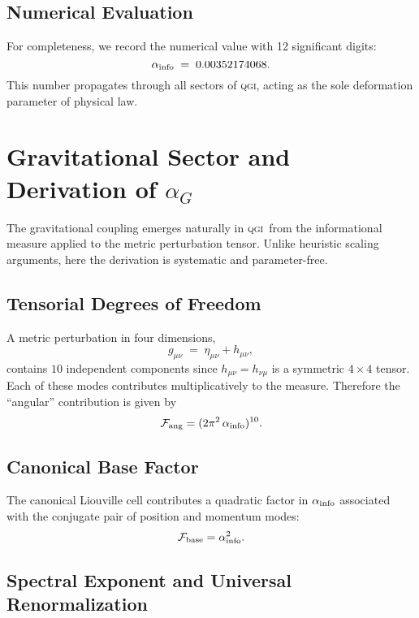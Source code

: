 \documentclass{article}
\numberwithin{equation}{section}
\theoremstyle{plain}
\theoremstyle{definition}
\theoremstyle{remark}
\newcommand{\qgi}{\textsc{qgi}}
\newcommand{\ainfoapprox}{0.00352174068}
\begin{document}
\subsection{Numerical Evaluation}
For completeness, we record the numerical value with 12 significant digits:
\begin{equation}
\alpha_{\rm info} \;=\; \ainfoapprox.
\end{equation}
This number propagates through all sectors of \qgi, acting as the sole deformation parameter of physical law.


\section{Gravitational Sector and Derivation of \texorpdfstring{$\alpha_G$}{α\_G}}
\label{app:alphaG}

The gravitational coupling emerges naturally in \qgi\ from the informational measure applied to the metric perturbation tensor. 
Unlike heuristic scaling arguments, here the derivation is systematic and parameter-free.

\subsection{Tensorial Degrees of Freedom}
A metric perturbation in four dimensions,
\begin{equation}
g_{\mu\nu} \;=\; \eta_{\mu\nu} + h_{\mu\nu},
\end{equation}
contains $10$ independent components since $h_{\mu\nu} = h_{\nu\mu}$ is a symmetric $4\times 4$ tensor. 
Each of these modes contributes multiplicatively to the measure. 
Therefore the ``angular'' contribution is given by
\begin{equation}
\mathcal{F}_{\rm ang} = (2\pi^2 \, \alpha_{\rm info})^{10}.
\end{equation}

\subsection{Canonical Base Factor}
The canonical Liouville cell contributes a quadratic factor in $\alpha_{\rm info}$ associated with the conjugate pair of position and momentum modes:
\begin{equation}
\mathcal{F}_{\rm base} = \alpha_{\rm info}^2.
\end{equation}

\subsection{Spectral Exponent and Universal Renormalization}
\label{subsec:calibration_exponent}
\end{document}
